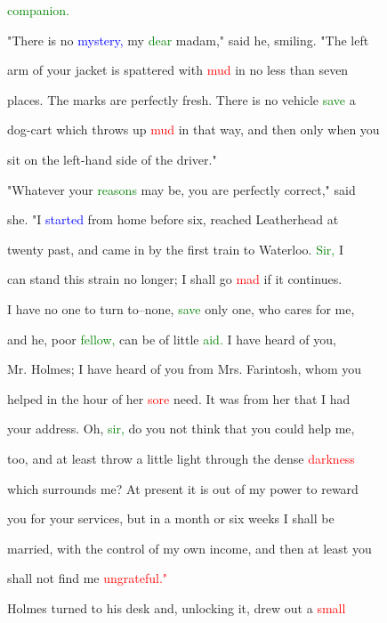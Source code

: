  \textcolor{green}{companion.}



 "There is no \textcolor{blue}{mystery,} my \textcolor{green}{dear} madam," said he, \textcolor{BurntOrange}{smiling.} "The left

 arm of your jacket is spattered with \textcolor{red}{mud} in no less than seven

 places. The marks are perfectly fresh. There is no vehicle \textcolor{green}{save} a

 dog-cart which throws up \textcolor{red}{mud} in that way, and then only when you

 sit on the left-hand side of the driver."



 "Whatever your \textcolor{green}{reasons} may be, you are perfectly correct," said

 she. "I \textcolor{blue}{started} from home before six, reached Leatherhead at

 twenty past, and came in by the first train to Waterloo. \textcolor{green}{Sir,} I

 can stand this strain no longer; I shall go \textcolor{red}{mad} if it \textcolor{BurntOrange}{continues.}

 I have no one to turn to--none, \textcolor{green}{save} only one, who cares for me,

 and he, poor \textcolor{green}{fellow,} can be of little \textcolor{green}{aid.} I have heard of you,

 Mr. Holmes; I have heard of you from Mrs. Farintosh, whom you

 helped in the hour of her \textcolor{red}{sore} need. It was from her that I had

 your address. Oh, \textcolor{green}{sir,} do you not think that you could help me,

 too, and at least throw a little light through the dense \textcolor{red}{darkness}

 which \textcolor{BurntOrange}{surrounds} me? At \textcolor{BurntOrange}{present} it is out of my power to \textcolor{BurntOrange}{reward}

 you for your services, but in a month or six weeks I shall be

 married, with the control of my own \textcolor{BurntOrange}{income,} and then at least you

 shall not find me \textcolor{red}{ungrateful."}



 Holmes turned to his desk and, unlocking it, drew out a \textcolor{red}{small}

